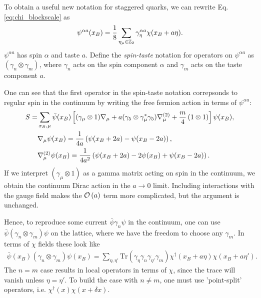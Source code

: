     To obtain a useful new notation for staggered quarks, we can rewrite Eq. \eqref{eq:chi_blockscale} as
    \begin{align}
      \psi^{\alpha a}(x_B) = {1\over 8} \sum_{\eta_{\mu}\in\mathbb{Z}_2} \gamma_{\eta}^{\alpha a} \chi(x_B+a\eta).
    \end{align}
$\psi^{\alpha a}$ has spin $\alpha$ and taste $a$. Define the {\it{spin-taste}} notation for operators on $\psi^{\alpha a}$ as $(\gamma_n\otimes \gamma_m)$, where $\gamma_n$ acts on the spin component $\alpha$ and $\gamma_m$ acts on the taste component $a$. 

    One can see that the first operator in the spin-taste notation correpsonds to regular spin in the continuum by writing the free fermion action in terms of $\psi^{\alpha a}$:
    \begin{align}
      \nonumber
      S =& \sum_{x_B,\mu} \bar{\psi}(x_B) \left[ (\gamma_{\mu}\otimes 1) \nabla_{\mu} + a ( \gamma_5 \otimes \gamma^*_{\mu} \gamma_5 ) \nabla^{(2)}_{\mu} + {m\over 4}\, (1\otimes 1)  \right] \psi(x_B), \\
      \nonumber
      &\nabla_{\mu}\psi(x_B) = {1\over 4a}\left( \psi(x_B+2a) - \psi(x_B-2a) \right), \\
      &\nabla^{(2)}_{\mu}\psi(x_B) = {1\over 4a^2}\left( \psi(x_B+2a) - 2\psi(x_B) + \psi(x_B-2a) \right).
    \end{align}
If we interpret $(\gamma_{\mu}\otimes 1)$ as a gamma matrix acting on spin in the continuum, we obtain the continuum Dirac action in the $a\to 0$ limit. Including interactions with the gauge field makes the $\mathcal{O}\left( a \right)$ term more complicated, but the argument is unchanged.

    Hence, to reproduce some current $\bar{\psi}\gamma_n\psi$ in the continuum, one can use $\bar{\psi}(\gamma_n\otimes \gamma_m)\psi$ on the lattice, where we have the freedom to choose any $\gamma_m$. In terms of $\chi$ fields these look like
    \begin{align}
      \bar{\psi}(x_B)(\gamma_n\otimes \gamma_m) \psi(x_B) = \sum_{\eta,\eta'} \text{Tr} (\gamma_{\eta} \gamma_n \gamma_{\eta'} \gamma_m) \chi^{\dagger}(x_B+a\eta) \chi(x_B+a\eta').
    \end{align}
    The $n=m$ case results in local operators in terms of $\chi$, since the trace will vanish unless $\eta=\eta'$. To build the case with $n\neq m$, one must use 'point-split' operators, i.e. $\chi^{\dagger} (x) \chi(x+\delta x)$.


